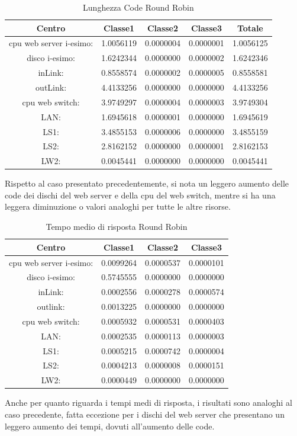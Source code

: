 \begin{table}[htbp]
\begin{center}
\begin{tabular}{||c|c|c|c|c||}
\hline
Centro &Classe1 &Classe2 &Classe3 &Totale\\
\hline
\hline
 cpu web server i-esimo: 	&1.0056119	&0.0000004	&0.0000001	&1.0056125\\
\hline
 disco i-esimo: 	&1.6242344	&0.0000000	&0.0000002	&1.6242346\\
\hline
 inLink: 	&0.8558574	&0.0000002	&0.0000005	&0.8558581\\
\hline
 outLink: 	&4.4133256	&0.0000000	&0.0000000	&4.4133256\\
\hline
 cpu web switch: 	&3.9749297	&0.0000004	&0.0000003	&3.9749304\\
\hline
 LAN: 	&1.6945618	&0.0000001	&0.0000000	&1.6945619\\
\hline
 LS1: 	&3.4855153	&0.0000006	&0.0000000	&3.4855159\\
\hline
 LS2: 	&2.8162152	&0.0000000	&0.0000001	&2.8162153\\
\hline
 LW2: 	&0.0045441	&0.0000000	&0.0000000	&0.0045441\\
\hline
\end{tabular}
\end{center}
\caption{Lunghezza Code Round Robin}
\label{lunghezzacode}
\end{table}
Rispetto al caso presentato precedentemente, si nota un leggero aumento delle code dei dischi del web server e della cpu del web switch, mentre si ha una leggera diminuzione o valori analoghi per tutte le altre risorse.
\begin{table}[htbp]
\begin{center}
\begin{tabular}{||c|c|c|c||}
\hline
Centro &Classe1 &Classe2 &Classe3\\
\hline
\hline
 cpu web server i-esimo: 	&0.0099264	&0.0000537	&0.0000101\\
\hline
 disco i-esimo: 	&0.5745555	&0.0000000	&0.0000000\\
\hline
 inLink: 	&0.0002556	&0.0000278	&0.0000574\\
\hline
 outlink: 	&0.0013225	&0.0000000	&0.0000000\\
\hline
 cpu web switch: 	&0.0005932	&0.0000531	&0.0000403\\
\hline
 LAN: 	&0.0002535	&0.0000113	&0.0000003\\
\hline
 LS1: 	&0.0005215	&0.0000742	&0.0000004\\
\hline
 LS2: 	&0.0004213	&0.0000008	&0.0000151\\
\hline
 LW2: 	&0.0000449	&0.0000000	&0.0000000\\
\hline
\end{tabular}
\end{center}
\caption{Tempo medio di risposta Round Robin}
\label{tempomediorisposta}
\end{table}
Anche per quanto riguarda i tempi medi di risposta, i risultati sono analoghi al caso precedente, fatta eccezione per i dischi del web server che presentano un leggero aumento dei tempi, dovuti all'aumento delle code.
